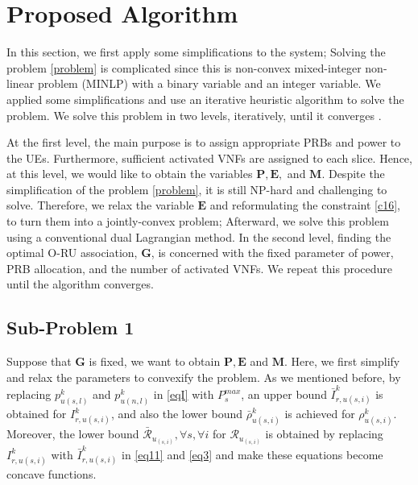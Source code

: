 \documentclass[lettersize,journal]{IEEEtran}
\begin{document}
\section{Proposed Algorithm}\label{proAlg}
In this section, we first apply some simplifications to the system; Solving the problem \eqref{problem} is complicated since this is non-convex mixed-integer non-linear problem (MINLP) with a binary variable and an integer variable.
We applied some simplifications and use an iterative heuristic algorithm to solve the problem.
We solve this problem in two levels, iteratively, until it converges \cite{ali2018joint}.

At the first level, the main purpose is to assign appropriate PRBs and power to the UEs. Furthermore, sufficient activated VNFs are assigned to each slice. Hence, at this level, we would like to obtain the variables $\boldsymbol{P}, \boldsymbol{E},$ and $\boldsymbol{M}$.
Despite the simplification of the problem
\eqref{problem}, it is still NP-hard and challenging to solve. Therefore,
we relax the variable $\boldsymbol{E}$ \cite{lee2018dynamic,ali2018joint} and reformulating the constraint \eqref{c16},
to turn them into a jointly-convex problem; Afterward, we solve this problem using a conventional dual Lagrangian method.
In the second level, finding the optimal O-RU association, $ \boldsymbol{G}$, is concerned with the fixed parameter of power, PRB allocation, and the number of activated VNFs.
We repeat this procedure until the algorithm converges.

\subsection{Sub-Problem 1}\label{sub1}
Suppose that $\boldsymbol{G}$ is fixed, we want to obtain $\boldsymbol{P}, \boldsymbol{E}$ and $\boldsymbol{M}$.
Here, we first simplify and relax the parameters to convexify the problem.
As we mentioned before, by replacing $p_{u(s,l)}^{k}$ and $p_{u(n,l)}^{k}$ in \eqref{eqI} with $P^{max}_s$, an upper bound $\bar{I}_{r,u(s,i)}^{k}$ is obtained for $I_{r,u(s,i)}^{k}$, and also the lower bound $\bar{\rho}_{u(s,i)}^{k}$ is achieved
for $\rho_{u(s,i)}^{k}$.
Moreover, the lower bound $\bar{\mathcal{R}}_{u_{(s,i)}}, \forall s , \forall i$ for  ${\mathcal{R}}_{u_{(s,i)}}$ is obtained by replacing $I_{r,u(s,i)}^{k}$ with $\bar{I}_{r,u(s,i)}^{k}$ in \eqref{eq11} and \eqref{eq3} and make these equations become concave functions.
\end{document}
